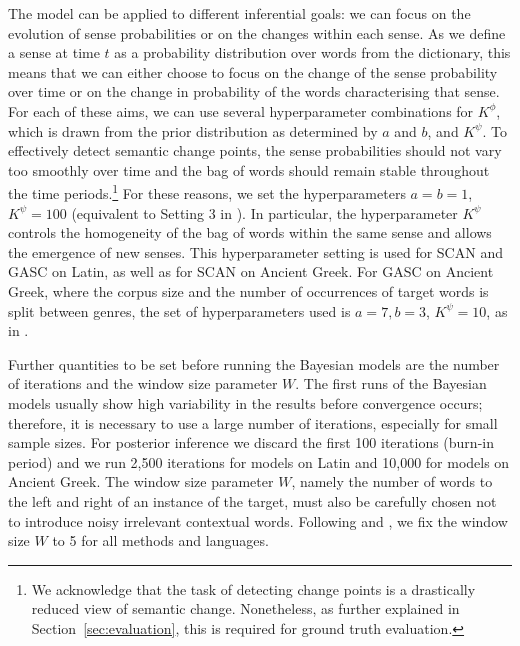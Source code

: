 \documentclass[output=paper]{langscibook}
\begin{document}
The model can be applied to different inferential goals: we can focus on the evolution of sense probabilities or on the changes within each sense. As we define a sense at time $t$ as a probability distribution over words from the dictionary, this means that we can either choose to focus on the change of the sense probability over time or on the change in probability of the words characterising that sense. For each of these aims, we can use several hyperparameter combinations for $K^\phi$, which is drawn from the prior distribution as determined by $a$ and $b$, and $K^\psi$.
To effectively detect semantic change points, the sense probabilities should not vary too smoothly over time and the bag of words should remain stable throughout the time periods.\footnote{We acknowledge that the task of detecting change points is a drastically reduced view of semantic change. Nonetheless, as further explained in Section~\ref{sec:evaluation}, this is required for ground truth evaluation.} For these reasons, we set the hyperparameters $a = b = 1$, $K^\psi = 100$ (equivalent to Setting 3 in \citealt{perrone-etal-2019-gasc}). In particular, the hyperparameter $K^\psi$ controls the homogeneity of the bag of words within the same sense and allows the emergence of new senses. This hyperparameter setting is used for SCAN and GASC on Latin, as well as for SCAN on Ancient Greek. For GASC on Ancient Greek, where the corpus size and the number of occurrences of target words is split between genres, the set of hyperparameters used is $a = 7, b = 3$, $K^\psi = 10$, as in \citet{frermann-lapata-2016-bayesian}.

Further quantities to be set before running the Bayesian models are the number of iterations and the window size parameter $W$. The first runs of the Bayesian models usually show high variability in the results before convergence occurs; therefore, it is necessary to use a large number of iterations, especially for small sample sizes. For posterior inference we discard the first 100 iterations (burn-in period) and we run 2,500 iterations for models on Latin and 10,000 for models on Ancient Greek. The window size parameter $W$, namely the number of words to the left and right of an instance of the target, must also be carefully chosen not to introduce noisy irrelevant contextual words. Following \citet{frermann-lapata-2016-bayesian} and \citet{perrone-etal-2019-gasc}, we fix the window size $W$ to 5 for all methods and languages.
\end{document}
